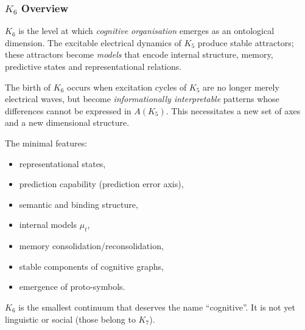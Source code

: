 

\subsubsection{\texorpdfstring{$K_6$}{K_6} Overview}
\label{sec:k6-overview}

$K_6$ is the level at which \emph{cognitive organisation} emerges as an
ontological dimension. The excitable electrical dynamics of $K_5$
produce stable attractors; these attractors become \emph{models} that
encode internal structure, memory, predictive states and representational
relations.

The birth of $K_6$ occurs when excitation cycles of $K_5$ are no longer
merely electrical waves, but become \emph{informationally interpretable}
patterns whose differences cannot be expressed in $A(K_5)$. This
necessitates a new set of axes and a new dimensional structure.

The minimal features:
\begin{itemize}
    \item representational states,
    \item prediction capability (prediction error axis),
    \item semantic and binding structure,
    \item internal models $\mu_t$,
    \item memory consolidation/reconsolidation,
    \item stable components of cognitive graphs,
    \item emergence of proto-symbols.
\end{itemize}

$K_6$ is the smallest continuum that deserves the name ``cognitive''. It
is not yet linguistic or social (those belong to $K_7$).

